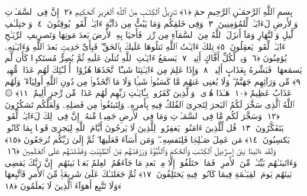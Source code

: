 
  
    
  
    
    

\nopagebreak
  بِسمِ ٱللَّهِ ٱلرَّحمَـٰنِ ٱلرَّحِيمِ
  حمٓ ﴿١﴾
 تَنزِيلُ ٱلكِتَـٰبِ مِنَ ٱللَّهِ ٱلعَزِيزِ ٱلحَكِيمِ ﴿٢﴾
 إِنَّ فِى ٱلسَّمَـٰوَٟتِ وَٱلأَرضِ لَءَايَـٰتٍۢ لِّلمُؤمِنِينَ ﴿٣﴾
 وَفِى خَلقِكُم وَمَا يَبُثُّ مِن دَآبَّةٍ ءَايَـٰتٌۭ لِّقَومٍۢ يُوقِنُونَ ﴿٤﴾
 وَٱختِلَـٰفِ ٱلَّيلِ وَٱلنَّهَارِ وَمَآ أَنزَلَ ٱللَّهُ مِنَ ٱلسَّمَآءِ مِن رِّزقٍۢ فَأَحيَا بِهِ ٱلأَرضَ بَعدَ مَوتِهَا وَتَصرِيفِ ٱلرِّيَـٰحِ ءَايَـٰتٌۭ لِّقَومٍۢ يَعقِلُونَ ﴿٥﴾
 تِلكَ ءَايَـٰتُ ٱللَّهِ نَتلُوهَا عَلَيكَ بِٱلحَقِّ ۖ فَبِأَىِّ حَدِيثٍۭ بَعدَ ٱللَّهِ وَءَايَـٰتِهِۦ يُؤمِنُونَ ﴿٦﴾
 وَيلٌۭ لِّكُلِّ أَفَّاكٍ أَثِيمٍۢ ﴿٧﴾
 يَسمَعُ ءَايَـٰتِ ٱللَّهِ تُتلَىٰ عَلَيهِ ثُمَّ يُصِرُّ مُستَكبِرًۭا كَأَن لَّم يَسمَعهَا ۖ فَبَشِّرهُ بِعَذَابٍ أَلِيمٍۢ ﴿٨﴾
 وَإِذَا عَلِمَ مِن ءَايَـٰتِنَا شَيـًٔا ٱتَّخَذَهَا هُزُوًا ۚ أُو۟لَـٰٓئِكَ لَهُم عَذَابٌۭ مُّهِينٌۭ ﴿٩﴾
 مِّن وَرَآئِهِم جَهَنَّمُ ۖ وَلَا يُغنِى عَنهُم مَّا كَسَبُوا۟ شَيـًۭٔا وَلَا مَا ٱتَّخَذُوا۟ مِن دُونِ ٱللَّهِ أَولِيَآءَ ۖ وَلَهُم عَذَابٌ عَظِيمٌ ﴿١٠﴾
 هَـٰذَا هُدًۭى ۖ وَٱلَّذِينَ كَفَرُوا۟ بِـَٔايَـٰتِ رَبِّهِم لَهُم عَذَابٌۭ مِّن رِّجزٍ أَلِيمٌ ﴿١١﴾
 ۞ ٱللَّهُ ٱلَّذِى سَخَّرَ لَكُمُ ٱلبَحرَ لِتَجرِىَ ٱلفُلكُ فِيهِ بِأَمرِهِۦ وَلِتَبتَغُوا۟ مِن فَضلِهِۦ وَلَعَلَّكُم تَشكُرُونَ ﴿١٢﴾
 وَسَخَّرَ لَكُم مَّا فِى ٱلسَّمَـٰوَٟتِ وَمَا فِى ٱلأَرضِ جَمِيعًۭا مِّنهُ ۚ إِنَّ فِى ذَٟلِكَ لَءَايَـٰتٍۢ لِّقَومٍۢ يَتَفَكَّرُونَ ﴿١٣﴾
 قُل لِّلَّذِينَ ءَامَنُوا۟ يَغفِرُوا۟ لِلَّذِينَ لَا يَرجُونَ أَيَّامَ ٱللَّهِ لِيَجزِىَ قَومًۢا بِمَا كَانُوا۟ يَكسِبُونَ ﴿١٤﴾
 مَن عَمِلَ صَـٰلِحًۭا فَلِنَفسِهِۦ ۖ وَمَن أَسَآءَ فَعَلَيهَا ۖ ثُمَّ إِلَىٰ رَبِّكُم تُرجَعُونَ ﴿١٥﴾
 وَلَقَد ءَاتَينَا بَنِىٓ إِسرَٰٓءِيلَ ٱلكِتَـٰبَ وَٱلحُكمَ وَٱلنُّبُوَّةَ وَرَزَقنَـٰهُم مِّنَ ٱلطَّيِّبَٰتِ وَفَضَّلنَـٰهُم عَلَى ٱلعَـٰلَمِينَ ﴿١٦﴾
 وَءَاتَينَـٰهُم بَيِّنَـٰتٍۢ مِّنَ ٱلأَمرِ ۖ فَمَا ٱختَلَفُوٓا۟ إِلَّا مِنۢ بَعدِ مَا جَآءَهُمُ ٱلعِلمُ بَغيًۢا بَينَهُم ۚ إِنَّ رَبَّكَ يَقضِى بَينَهُم يَومَ ٱلقِيَـٰمَةِ فِيمَا كَانُوا۟ فِيهِ يَختَلِفُونَ ﴿١٧﴾
 ثُمَّ جَعَلنَـٰكَ عَلَىٰ شَرِيعَةٍۢ مِّنَ ٱلأَمرِ فَٱتَّبِعهَا وَلَا تَتَّبِع أَهوَآءَ ٱلَّذِينَ لَا يَعلَمُونَ ﴿١٨﴾
